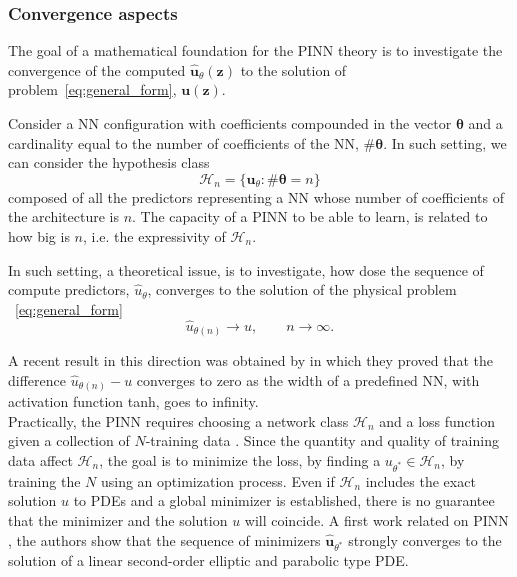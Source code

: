 \documentclass[pdflatex,sn-basic]{sn-jnl}%
\theoremstyle{thmstyleone}%
\theoremstyle{thmstyletwo}%
\theoremstyle{thmstylethree}%
\begin{document}
%



\subsubsection{Convergence aspects}


The goal of a mathematical foundation for the PINN theory is to investigate the convergence of the computed $\hat{\bm{u}}_\theta (\bm{z})$ to the solution of problem~\eqref{eq:general_form}, $\bm{u}(\bm{z})$.


Consider a NN configuration with coefficients compounded in the vector  $\bm{\theta}$ and a cardinality equal to the number of coefficients of the NN, $\#\bm{\theta}$.
In such setting, we can consider the hypothesis class
$$
\mathcal{H}_n = \{ \bm{u}_\theta  : \#\bm{\theta} = n \}
$$
composed of all the predictors representing a  NN  whose number of coefficients of  the architecture is $n$.
The capacity of a PINN to be able to learn, is related to how big is $n$, i.e. the expressivity  of $\mathcal{H}_n$.

In such setting, a theoretical issue, is to investigate, how dose the sequence of compute predictors, $\hat{u}_\theta$, converges to the solution of the physical problem ~\eqref{eq:general_form}
$$
\hat{u}_{\theta(n)} \to   u  ,\qquad n\to \infty.
$$

A recent result in this direction was  obtained  by \cite{De2021_ApproximationFunctionsTanh_LanDRLM}
in which they proved that the difference $\hat{u}_{\theta(n)} - u$ converges to zero as the width of a predefined NN, with activation function tanh,  goes to infinity.
%
\\
Practically, the PINN requires choosing a network class $\mathcal{H}_n$  and a loss function given a collection of $N$-training data \citep{Shi2020_ConvergencePhysicsInformed_DarSDK}.
Since the quantity and quality of training data affect  $\mathcal{H}_n$, 
the goal is to minimize the loss, by finding a $u_{\theta^*} \in \mathcal{H}_n$, by training the $N$ using an optimization process.
Even if $\mathcal{H}_n$ includes the exact solution $u$ to PDEs and a global minimizer is established, there is no guarantee that the minimizer and the solution $u$ will coincide.
A first work related on PINN \citep{Shi2020_ConvergencePhysicsInformed_DarSDK}, the authors show that the sequence of minimizers $\hat{\bm{u}}_{\theta^*}$ strongly converges to the solution of a linear second-order elliptic and parabolic type PDE.
\end{document}
